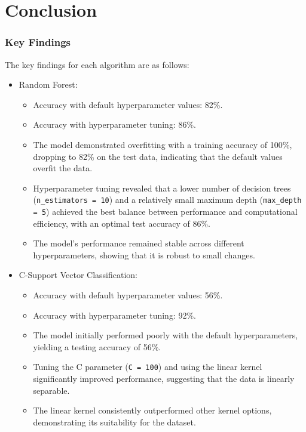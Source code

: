 \documentclass[a4paper, 10pt]{article}
\begin{document}
\section{Conclusion}
\subsubsection{Key Findings}
The key findings for each algorithm are as follows:
\begin{itemize}
    \item   Random Forest:
            \begin{itemize}
                \item   Accuracy with default hyperparameter values: 82\%.
                \item   Accuracy with hyperparameter tuning: 86\%.
                \item   The model demonstrated overfitting with a training accuracy of 100\%, dropping to 82\% on the test data, indicating that the default values overfit the data.
                \item   Hyperparameter tuning revealed that a lower number of decision trees (\texttt{n_estimators = 10}) and a relatively small maximum depth (\texttt{max_depth = 5}) achieved the best balance between performance and computational efficiency, with an optimal test accuracy of 86\%.
                \item   The model's performance remained stable across different hyperparameters, showing that it is robust to small changes.
            \end{itemize}

    \item   C-Support Vector Classification:
            \begin{itemize}
                \item   Accuracy with default hyperparameter values: 56\%.
                \item   Accuracy with hyperparameter tuning: 92\%.
                \item   The model initially performed poorly with the default hyperparameters, yielding a testing accuracy of 56\%.
                \item   Tuning the C parameter (\texttt{C = 100}) and using the linear kernel significantly improved performance, suggesting that the data is linearly separable.
                \item   The linear kernel consistently outperformed other kernel options, demonstrating its suitability for the dataset.
            \end{itemize}
\end{itemize}
\end{document}
